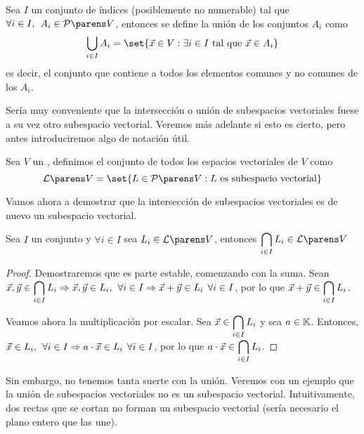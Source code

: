 \documentclass[../algebra_lineal.tex]{subfiles}
\begin{document}
\begin{definition}[Unión]
    Sea $I$ un conjunto de índices (posiblemente no numerable) tal que $\forall i \in I, \spc A_i \in \partesde{V}$, entonces se define la unión de los conjuntos $A_i$ como
    \[\bigcup_{i \in I}A_i = \set{\vx \in V : \exists i \in I \st \vx \in A_i}\]
    es decir, el conjunto que contiene a todos los elementos comunes y no comunes de los $A_i$.
\end{definition}

Sería muy conveniente que la intersección o unión de subespacios vectoriales fuese a su vez otro subespacio vectorial. Veremos más adelante si esto es cierto, pero antes introduciremos algo de notación útil.

\begin{definition}
    Sea $V$ un \kvspace, definimos el conjunto de todos los espacios vectoriales de $V$ como
    \[
        \subespaciosde{V} = \set{L \in \partesde{V} : L \mathrm{\, \, es \, \, subespacio \, \, vectorial }}
    \]
\end{definition}

Vamos ahora a demostrar que la intersección de subespacios vectoriales es de nuevo un subespacio vectorial.

\begin{proposition}
    Sea $I$ un conjunto y $\forall i \in I$ sea $L_i \in \subespaciosde{V}$, entonces $\displaystyle\bigcap_{i \in I}{L_i} \in \subespaciosde{V}$
\end{proposition}

\begin{proof}
    Demostraremos que es parte estable, comenzando con la suma.
    Sean $\vec{x}, \vec{y} \in \displaystyle\bigcap_{i \in I}L_i \Rightarrow \vec{x}, \vec{y} \in L_i, \hspace{1.5mm} \forall i \in I \Rightarrow \vec{x} + \vec{y} \in L_i \hspace{1.5mm} \forall i \in I$, por lo que $\vec{x} + \vec{y} \in \displaystyle\bigcap_{i \in I}L_i$.

    Veamos ahora la multiplicación por escalar. Sea $\vec{x} \in \displaystyle\bigcap_{i \in I}L_i$ y sea $a \in \mathbb{K}$. Entonces, $\vec{x} \in L_i, \hspace{1.5mm} \forall i \in I \Rightarrow a \cdot \vec{x} \in L_i \hspace{1.5mm} \forall i \in I$, por lo que $a \cdot \vec{x} \in \displaystyle\bigcap_{i \in I}L_i$.
\end{proof}

Sin embargo, no tenemos tanta suerte con la unión. Veremos con un ejemplo que la unión de subespacios vectoriales no es un subespacio vectorial. Intuitivamente, dos rectas que se cortan no forman un subespacio vectorial (sería necesario el plano entero que las une).
\end{document}

